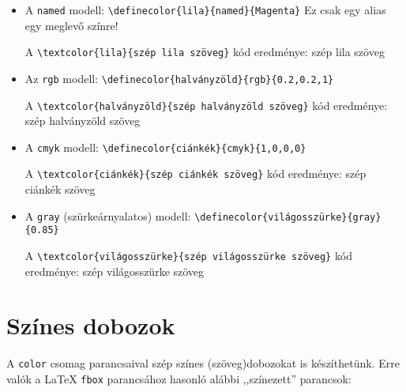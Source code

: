 \documentclass{article}
\begin{document}
\begin{itemize}
	\item A \verb!named! modell: \verb!\definecolor{lila}{named}{Magenta}! Ez csak egy alias egy meglevő színre!
	
	A \verb!\textcolor{lila}{szép lila szöveg}! kód eredménye: \textcolor{lila}{szép lila szöveg}
	\item Az \verb!rgb! modell: \verb!\definecolor{halványzöld}{rgb}{0.2,0.2,1}!
	
	A \verb!\textcolor{halványzöld}{szép halványzöld szöveg}!  kód eredménye:
	\textcolor{halványzöld}{szép halványzöld szöveg}
	
	\item A \verb!cmyk! modell: \verb!\definecolor{ciánkék}{cmyk}{1,0,0,0}!
	
	A \verb!\textcolor{ciánkék}{szép ciánkék szöveg}!   kód eredménye:
	\textcolor{ciánkék}{szép ciánkék szöveg}
	
	\item A \verb!gray! (szürkeárnyalatos) modell: \verb!\definecolor{világosszürke}{gray}{0.85}!
	
	A \verb!\textcolor{világosszürke}{szép világosszürke szöveg}!  kód eredménye:
	\textcolor{világosszürke}{szép világosszürke szöveg}
\end{itemize}

\pagebreak[4]
\section{Színes dobozok}

A  \verb!color! csomag parancsaival szép színes (szöveg)dobozokat is készíthetünk. Erre valók a \LaTeX{}  \verb!fbox! parancsához hasonló alábbi ,,színezett'' parancsok:

\vspace*{2ex}\vspace*{2ex}

\vspace*{2ex} \vspace*{2ex}

\vspace*{2ex}\vspace*{2ex}
\end{document}

